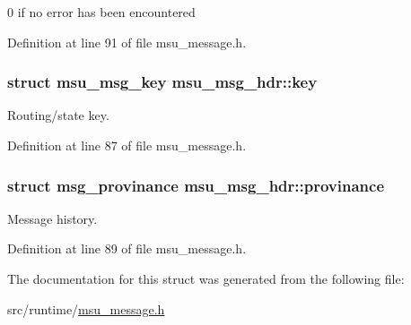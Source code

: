 0 if no error has been encountered 



Definition at line 91 of file msu\-\_\-message.\-h.

\hypertarget{structmsu__msg__hdr_a4fdc31ee60340dd9b2550df651fb185a}{
\subsubsection[{key}]{\setlength{\rightskip}{0pt plus 5cm}struct {\bf msu\-\_\-msg\-\_\-key} msu\-\_\-msg\-\_\-hdr\-::key}}\label{structmsu__msg__hdr_a4fdc31ee60340dd9b2550df651fb185a}


Routing/state key. 



Definition at line 87 of file msu\-\_\-message.\-h.

\hypertarget{structmsu__msg__hdr_ab64c7b4c508dd04d23bbd940cd6dabea}{
\subsubsection[{provinance}]{\setlength{\rightskip}{0pt plus 5cm}struct {\bf msg\-\_\-provinance} msu\-\_\-msg\-\_\-hdr\-::provinance}}\label{structmsu__msg__hdr_ab64c7b4c508dd04d23bbd940cd6dabea}


Message history. 



Definition at line 89 of file msu\-\_\-message.\-h.



The documentation for this struct was generated from the following file\-:\begin{DoxyCompactItemize}
\item 
src/runtime/\hyperlink{msu__message_8h}{msu\-\_\-message.\-h}\end{DoxyCompactItemize}
